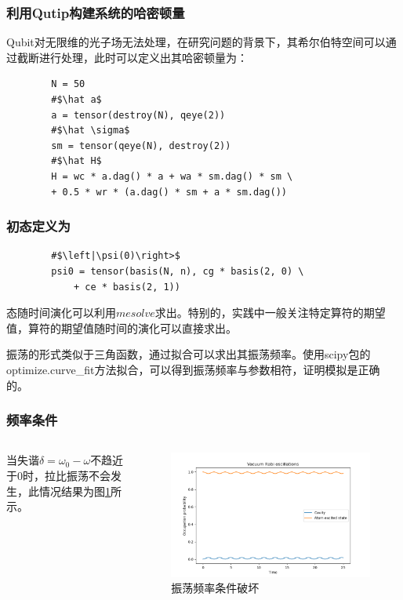 \documentclass[aspectratio=169, 12pt]{beamer}
\begin{document}
\begin{frame}
    \frametitle{利用Qutip构建系统的哈密顿量}
    Qubit对无限维的光子场无法处理，在研究问题的背景下，其希尔伯特空间可以通过截断进行处理，此时可以定义出其哈密顿量为：
    \begin{verbatim}
        N = 50
        #$\hat a$
        a = tensor(destroy(N), qeye(2))
        #$\hat \sigma$
        sm = tensor(qeye(N), destroy(2))
        #$\hat H$
        H = wc * a.dag() * a + wa * sm.dag() * sm \
        + 0.5 * wr * (a.dag() * sm + a * sm.dag())
    \end{verbatim}
\end{frame}

\begin{frame}[fragile]
    \frametitle{初态定义为}
    \begin{verbatim}
        #$\left|\psi(0)\right>$
        psi0 = tensor(basis(N, n), cg * basis(2, 0) \
            + ce * basis(2, 1))
    \end{verbatim}
    态随时间演化可以利用$mesolve$求出。特别的，实践中一般关注特定算符的期望值，算符的期望值随时间的演化可以直接求出。

    振荡的形式类似于三角函数，通过拟合可以求出其振荡频率。使用scipy包的optimize.curve\_fit方法拟合，可以得到振荡频率与参数相符，证明模拟是正确的。
\end{frame}

\begin{frame}
    \frametitle{频率条件}
    \begin{columns}
    当失谐$\delta = \omega_0 - \omega$不趋近于0时，拉比振荡不会发生，此情况结果为图\ref{fig:1}所示。
    \column{0.6\linewidth}
    \begin{figure}
        \centering
        \includegraphics[width=0.8\linewidth]{1.png}
        \caption{振荡频率条件破坏}
        \label{fig:1}
    \end{figure}
    \end{columns}
\end{frame}
\end{document}
